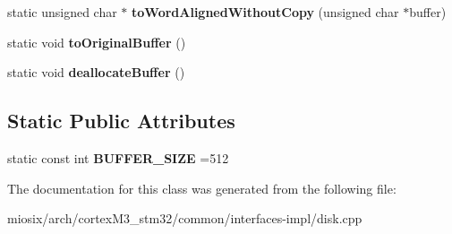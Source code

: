 \begin{DoxyCompactItemize}
\item 
\hypertarget{classmiosix_1_1_buffer_converter_a4ea5026a3edc7ce87a983a4bd6370093}{static unsigned char $\ast$ {\bfseries to\-Word\-Aligned\-Without\-Copy} (unsigned char $\ast$buffer)}\label{classmiosix_1_1_buffer_converter_a4ea5026a3edc7ce87a983a4bd6370093}

\item 
\hypertarget{classmiosix_1_1_buffer_converter_a093e1ba8dda0ba8356e79a90bde75e0c}{static void {\bfseries to\-Original\-Buffer} ()}\label{classmiosix_1_1_buffer_converter_a093e1ba8dda0ba8356e79a90bde75e0c}

\item 
\hypertarget{classmiosix_1_1_buffer_converter_ab3f05216a3d9a695acca79209eefdb80}{static void {\bfseries deallocate\-Buffer} ()}\label{classmiosix_1_1_buffer_converter_ab3f05216a3d9a695acca79209eefdb80}

\end{DoxyCompactItemize}
\subsection*{Static Public Attributes}
\begin{DoxyCompactItemize}
\item 
\hypertarget{classmiosix_1_1_buffer_converter_aad054bcc4f5556f02f877a6c5f1e9be7}{static const int {\bfseries B\-U\-F\-F\-E\-R\-\_\-\-S\-I\-Z\-E} =512}\label{classmiosix_1_1_buffer_converter_aad054bcc4f5556f02f877a6c5f1e9be7}

\end{DoxyCompactItemize}


The documentation for this class was generated from the following file\-:\begin{DoxyCompactItemize}
\item 
miosix/arch/cortex\-M3\-\_\-stm32/common/interfaces-\/impl/disk.\-cpp\end{DoxyCompactItemize}
